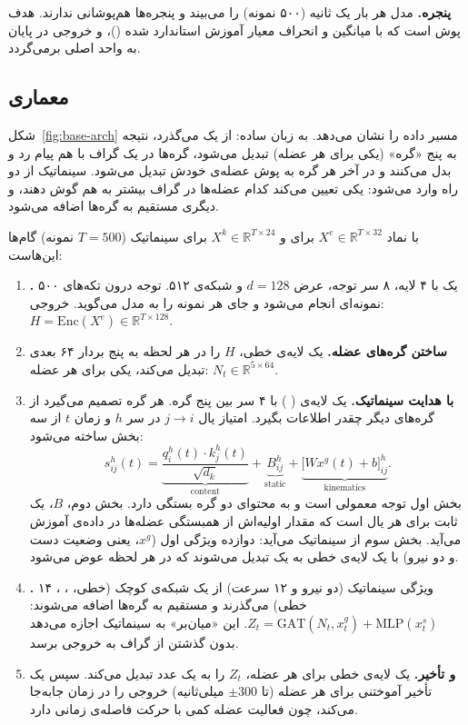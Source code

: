 \textbf{پنجره.} مدل هر بار یک ثانیه (۵۰۰ نمونه) را می‌بیند و پنجره‌ها هم‌پوشانی ندارند. هدف پوش  است که با میانگین و انحراف معیار آموزش استاندارد شده ()، و خروجی در پایان به واحد اصلی برمی‌گردد.

\subsection{معماری}

شکل~\ref{fig:base-arch} مسیر داده را نشان می‌دهد. به زبان ساده:  از یک  می‌گذرد، نتیجه به پنج «گره» (یکی برای هر عضله) تبدیل می‌شود، گره‌ها در یک گراف با هم پیام رد و بدل می‌کنند و در آخر هر گره به پوش عضله‌ی خودش تبدیل می‌شود. سینماتیک از دو راه وارد می‌شود: یکی تعیین می‌کند کدام عضله‌ها در گراف بیشتر به هم گوش دهند، و دیگری مستقیم به گره‌ها اضافه می‌شود.

با نماد $X^{e}\in\mathbb{R}^{T\times 32}$ برای  و $X^{k}\in\mathbb{R}^{T\times 24}$ برای سینماتیک ($T=500$ نمونه) گام‌ها این‌هاست:

\begin{enumerate}
\item \textbf{.} یک  با ۴ لایه، ۸ سر توجه، عرض $d=128$ و شبکه‌ی  ۵۱۲. توجه درون تکه‌های ۵۰۰ نمونه‌ای انجام می‌شود و  جای هر نمونه را به مدل می‌گوید. خروجی: $H=\mathrm{Enc}(X^{e})\in\mathbb{R}^{T\times128}$.
\item \textbf{ساختن گره‌های عضله.} یک لایه‌ی خطی، $H$ را در هر لحظه به پنج بردار ۶۴ بعدی تبدیل می‌کند، یکی برای هر عضله: $N_t\in\mathbb{R}^{5\times 64}$.
\item \textbf{ با هدایت سینماتیک.} یک لایه‌ی  ( \cite{velickovic2018}) با ۴ سر بین پنج گره. هر گره تصمیم می‌گیرد از گره‌های دیگر چقدر اطلاعات بگیرد. امتیاز یال $j\to i$ در سر $h$ و زمان $t$ از سه بخش ساخته می‌شود:
\begin{equation}
s^{h}_{ij}(t)=\underbrace{\frac{q^{h}_i(t)\cdot k^{h}_j(t)}{\sqrt{d_k}}}_{\text{content}}+\underbrace{B^{h}_{ij}}_{\text{static}}+\underbrace{\big[W x^{g}(t)+b\big]^{h}_{ij}}_{\text{kinematics}}.
\end{equation}
بخش اول توجه معمولی است و به محتوای دو گره بستگی دارد. بخش دوم، $B$، یک  ثابت برای هر یال است که مقدار اولیه‌اش از همبستگی  عضله‌ها در داده‌ی آموزش می‌آید. بخش سوم از سینماتیک می‌آید: دوازده ویژگی اول ($x^{g}$، یعنی وضعیت دست و دو نیرو) با یک لایه‌ی خطی به یک  تبدیل می‌شوند که در هر لحظه عوض می‌شود.
\item \textbf{.} ۱۴ ویژگی سینماتیک (دو نیرو و ۱۲ سرعت) از یک شبکه‌ی کوچک (خطی، ، ، خطی) می‌گذرند و مستقیم به گره‌ها اضافه می‌شوند: $Z_t=\mathrm{GAT}(N_t,x^{g}_t)+\mathrm{MLP}(x^{s}_t)$. این «میان‌بر» به سینماتیک اجازه می‌دهد بدون گذشتن از گراف به خروجی برسد.
\item \textbf{ و تأخیر.} یک لایه‌ی خطی برای هر عضله، $Z_t$ را به یک عدد تبدیل می‌کند. سپس یک تأخیر آموختنی برای هر عضله (تا $\pm300$ میلی‌ثانیه) خروجی را در زمان جابه‌جا می‌کند، چون فعالیت عضله کمی با حرکت فاصله‌ی زمانی دارد.
\end{enumerate}

